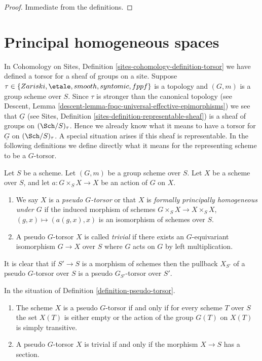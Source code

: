 \begin{proof}
Immediate from the definitions.
\end{proof}






\section{Principal homogeneous spaces}
\label{section-principal-homogeneous}

\noindent
In
Cohomology on Sites, Definition \ref{sites-cohomology-definition-torsor}
we have defined a torsor for a sheaf of groups on a site.
Suppose $\tau \in \{Zariski, \etale, smooth, syntomic, fppf\}$ is a
topology and $(G, m)$ is a group scheme over $S$. Since $\tau$ is stronger than
the canonical topology (see
Descent, Lemma \ref{descent-lemma-fpqc-universal-effective-epimorphisms})
we see that $\underline{G}$ (see
Sites, Definition \ref{sites-definition-representable-sheaf})
is a sheaf of groups on $(\Sch/S)_\tau$.
Hence we already know what it means to have a
torsor for $\underline{G}$ on $(\Sch/S)_\tau$. A special situation
arises if this sheaf is representable. In the following definitions
we define directly what it means for the representing scheme to be a
$G$-torsor.

\begin{definition}
\label{definition-pseudo-torsor}
Let $S$ be a scheme.
Let $(G, m)$ be a group scheme over $S$.
Let $X$ be a scheme over $S$, and let
$a : G \times_S X \to X$ be an action of $G$ on $X$.
\begin{enumerate}
\item We say $X$ is a {\it pseudo $G$-torsor} or that $X$ is
{\it formally principally homogeneous under $G$} if the induced
morphism of schemes $G \times_S X \to X \times_S X$,
$(g, x) \mapsto (a(g, x), x)$ is an isomorphism of schemes over $S$.
\item A pseudo $G$-torsor $X$ is called {\it trivial} if there exists
an $G$-equivariant isomorphism $G \to X$ over $S$ where $G$ acts on
$G$ by left multiplication.
\end{enumerate}
\end{definition}

\noindent
It is clear that if $S' \to S$ is a morphism of schemes then
the pullback $X_{S'}$ of a pseudo $G$-torsor over $S$ is a
pseudo $G_{S'}$-torsor over $S'$.

\begin{lemma}
\label{lemma-characterize-trivial-pseudo-torsors}
In the situation of
Definition \ref{definition-pseudo-torsor}.
\begin{enumerate}
\item The scheme $X$ is a pseudo $G$-torsor if and only if for every scheme
$T$ over $S$ the set $X(T)$ is either empty or the action of the group $G(T)$
on $X(T)$ is simply transitive.
\item A pseudo $G$-torsor $X$ is trivial if and only if the morphism
$X \to S$ has a section.
\end{enumerate}
\end{lemma}


